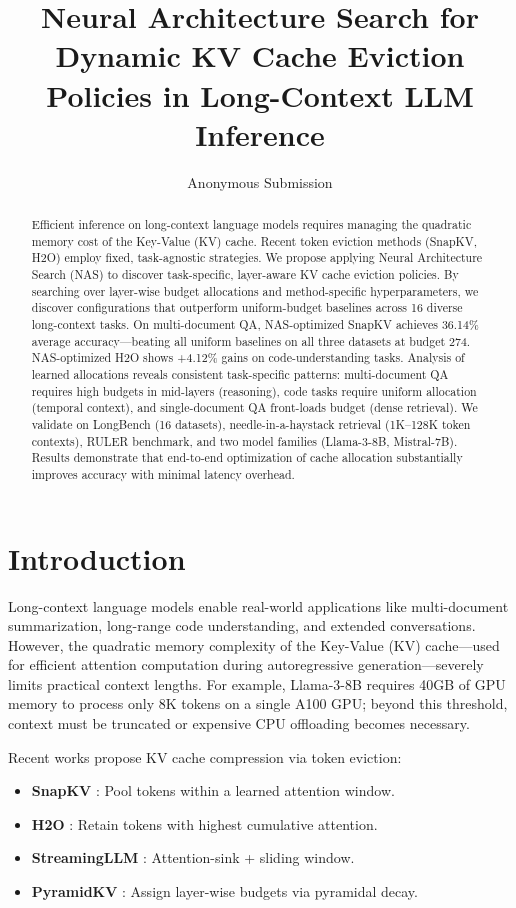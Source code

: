\documentclass[11pt]{article}
\title{Neural Architecture Search for Dynamic KV Cache Eviction Policies in Long-Context LLM Inference}
\author{Anonymous Submission}
\begin{document}
\maketitle

\begin{abstract}
Efficient inference on long-context language models requires managing the quadratic memory cost of the Key-Value (KV) cache. Recent token eviction methods (SnapKV, H2O) employ fixed, task-agnostic strategies. We propose applying Neural Architecture Search (NAS) to discover task-specific, layer-aware KV cache eviction policies. By searching over layer-wise budget allocations and method-specific hyperparameters, we discover configurations that outperform uniform-budget baselines across 16 diverse long-context tasks. On multi-document QA, NAS-optimized SnapKV achieves 36.14\% average accuracy—beating all uniform baselines on all three datasets at budget 274. NAS-optimized H2O shows +4.12\% gains on code-understanding tasks. Analysis of learned allocations reveals consistent task-specific patterns: multi-document QA requires high budgets in mid-layers (reasoning), code tasks require uniform allocation (temporal context), and single-document QA front-loads budget (dense retrieval). We validate on LongBench (16 datasets), needle-in-a-haystack retrieval (1K–128K token contexts), RULER benchmark, and two model families (Llama-3-8B, Mistral-7B). Results demonstrate that end-to-end optimization of cache allocation substantially improves accuracy with minimal latency overhead.
\end{abstract}

\section{Introduction}

Long-context language models enable real-world applications like multi-document summarization, long-range code understanding, and extended conversations. However, the quadratic memory complexity of the Key-Value (KV) cache—used for efficient attention computation during autoregressive generation—severely limits practical context lengths. For example, Llama-3-8B requires 40GB of GPU memory to process only 8K tokens on a single A100 GPU; beyond this threshold, context must be truncated or expensive CPU offloading becomes necessary.

Recent works propose KV cache compression via token eviction:
\begin{itemize}
    \item \textbf{SnapKV} \citep{Li2024}: Pool tokens within a learned attention window.
    \item \textbf{H2O} \citep{Zhang2023}: Retain tokens with highest cumulative attention.
    \item \textbf{StreamingLLM} \citep{Su2023}: Attention-sink + sliding window.
    \item \textbf{PyramidKV} \citep{Cai2024}: Assign layer-wise budgets via pyramidal decay.
\end{itemize}
\end{document}
